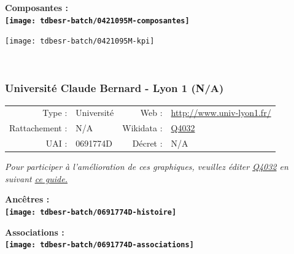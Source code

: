\documentclass[12pt,french,]{article}
\begin{document}
\hrulefill

\begin{center} \bf Composantes : \\  
\texttt{[image: tdbesr-batch/0421095M-composantes]} \end{center}

\begin{center}\texttt{[image: tdbesr-batch/0421095M-kpi]} \end{center}\checkoddpage

\ifoddpage \fi ~\newpage  

\hypertarget{universituxe9-claude-bernard---lyon-1-na}{%
\subsubsection{Université Claude Bernard - Lyon 1
(N/A)}\label{universituxe9-claude-bernard---lyon-1-na}}

\begin{tabular*}{\textwidth}{rp{5cm}rl}  
\hline  
Type : & Université & Web : &\href{http://www.univ-lyon1.fr/}{http://www.univ-lyon1.fr/} \\  
Rattachement : & N/A & Wikidata : & \href{https://www.wikidata.org/entity/Q4032}{Q4032} \\  
UAI : & 0691774D & Décret : & N/A \\  
\hline  
\end{tabular*}

\textit{\scriptsize Pour participer à l'amélioration de ces graphiques, veuillez éditer  \href{https://www.wikidata.org/entity/Q4032}{Q4032}  en suivant \href{https://github.com/cpesr/wikidataESR/blob/master/Rmd/wikidataESR.md}{ce guide.}}

\vspace{1cm}  
\begin{minipage}[b]{0.50\textwidth}\begin{center} \bf Ancêtres : \\  
\texttt{[image: tdbesr-batch/0691774D-histoire]} \end{center}\end{minipage}\begin{minipage}[b]{0.50\textwidth}\begin{center} \bf Associations : \\  
\texttt{[image: tdbesr-batch/0691774D-associations]} \end{center}\end{minipage}

\hrulefill
\end{document}

